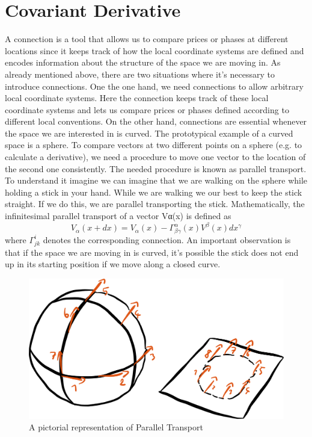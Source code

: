 \section{Covariant Derivative}
A connection is a tool that allows us to compare prices or phases at different locations since
it keeps track of how the local coordinate systems are defined and encodes information about
the structure of the space we are moving in.
As already mentioned above, there are two situations where it’s necessary to introduce
connections. One the one hand, we need connections to allow arbitrary local coordinate
systems. Here the connection keeps track of these local coordinate systems and lets us
compare prices or phases defined according to different local conventions. On the other
hand, connections are essential whenever the space we are interested in is curved.
The prototypical example of a curved space is a sphere. To compare vectors at two different
points on a sphere (e.g. to calculate a derivative), we need a procedure to move one vector
to the location of the second one consistently.
The needed procedure is known as parallel transport. To understand it imagine we can
imagine that we are walking on the sphere while holding a stick in your hand. While we are
walking we our best to keep the stick straight. If we do this, we are parallel transporting
the stick.
Mathematically, the infinitesimal parallel transport of a vector Vα(x) is defined as
\begin{equation}
V_{\alpha}(x + dx) = V_{\alpha}(x) - \Gamma^{\alpha}_{\beta \gamma}(x)V^{\beta}(x)dx^{\gamma}
\end{equation}
    where $\Gamma^{i}_{jk}$ denotes the corresponding connection.
An important observation is that if the space we are moving in is curved, it’s possible
the stick does not end up in its starting position if we move along a closed curve.
\begin{figure}[!ht]
	\centering
	\includegraphics[scale=0.2]{Figures/23-2.png}
	\caption{A pictorial representation of Parallel Transport}
\end{figure}
